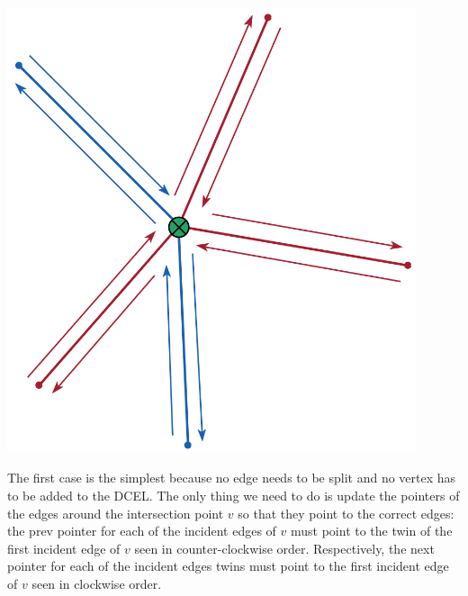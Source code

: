 \begin{minipage}{0.3\textwidth}
    \centering
    \includegraphics[width=0.9\textwidth]{images/vertex.png}
\end{minipage}\hfill
\begin{minipage}{0.7\textwidth}
    The first case is the simplest because no edge needs to be split and no vertex has to be added to the DCEL. The only thing we need to do is update the pointers of the edges around the intersection point $v$ so that they point to the correct edges: the prev pointer for each of the incident edges of $v$ must point to the twin of the first incident edge of $v$ seen in counter-clockwise order. Respectively, the next pointer for each of the incident edges twins must point to the first incident edge of $v$ seen in clockwise order.
\end{minipage}
\break


